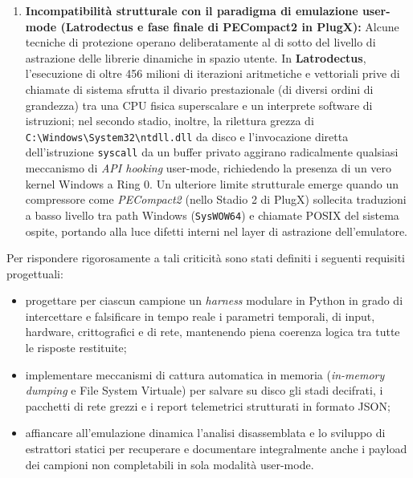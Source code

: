 \documentclass[11pt, a4paper]{article}
\begin{document}
\begin{enumerate}
	\item \textbf{Incompatibilit\`a strutturale con il paradigma di emulazione user-mode (Latrodectus e fase finale di PECompact2 in PlugX):} Alcune tecniche di protezione operano deliberatamente al di sotto del livello di astrazione delle librerie dinamiche in spazio utente. In \textbf{Latrodectus}, l'esecuzione di oltre 456 milioni di iterazioni aritmetiche e vettoriali prive di chiamate di sistema sfrutta il divario prestazionale (di diversi ordini di grandezza) tra una CPU fisica superscalare e un interprete software di istruzioni; nel secondo stadio, inoltre, la rilettura grezza di \texttt{C:\textbackslash\allowbreak{}Windows\textbackslash\allowbreak{}System32\textbackslash\allowbreak{}ntdll.\allowbreak{}dll} da disco e l'invocazione diretta dell'istruzione \texttt{syscall} da un buffer privato aggirano radicalmente qualsiasi meccanismo di \textit{API hooking} user-mode, richiedendo la presenza di un vero kernel Windows a Ring 0. Un ulteriore limite strutturale emerge quando un compressore come \textit{PECompact2} (nello Stadio 2 di PlugX) sollecita traduzioni a basso livello tra path Windows (\texttt{SysWOW64}) e chiamate POSIX del sistema ospite, portando alla luce difetti interni nel layer di astrazione dell'emulatore.
\end{enumerate}

Per rispondere rigorosamente a tali criticit\`a sono stati definiti i seguenti requisiti progettuali:
\begin{itemize}
	\item progettare per ciascun campione un \textit{harness} modulare in Python in grado di intercettare e falsificare in tempo reale i parametri temporali, di input, hardware, crittografici e di rete, mantenendo piena coerenza logica tra tutte le risposte restituite;
	\item implementare meccanismi di cattura automatica in memoria (\textit{in-memory dumping} e File System Virtuale) per salvare su disco gli stadi decifrati, i pacchetti di rete grezzi e i report telemetrici strutturati in formato JSON;
	\item affiancare all'emulazione dinamica l'analisi disassemblata e lo sviluppo di estrattori statici per recuperare e documentare integralmente anche i payload dei campioni non completabili in sola modalit\`a user-mode.
\end{itemize}

\end{document}
